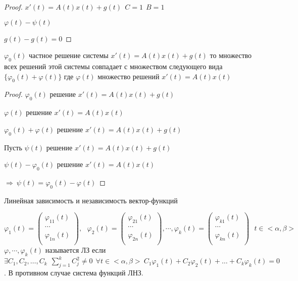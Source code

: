 \begin{proof}
  $x'(t) = A(t)x(t) + g(t) ~~ C = 1 ~~ B = 1$

  $\varphi(t) - \psi(t)$

  $g(t) - g(t) = 0$
\end{proof}

\begin{block}[Слeдствие 2]
  $\varphi_0(t)$ частное решение системы $x'(t) = A(t)x(t) + g(t)$ то
  множество всех решений этой системы совпадает с множеством следующего вида
  $\{\varphi_0(t) + \varphi(t)\}$ где $\varphi(t)$ множество решений
  $x'(t) = A(t)x(t)$
\end{block}

\begin{proof}
  $\varphi_0(t)$ решение $x'(t) = A(t)x(t) + g(t)$

  $\varphi(t)$ решение $x'(t) = A(t)x(t)$

  $\varphi_0(t) + \varphi(t)$ решение $x'(t) = A(t)x(t) + g(t)$

  Пусть $\psi(t)$ решение $x'(t) = A(t)x(t) + g(t)$

  $\psi(t) - \varphi_0(t)$ решение $x'(t) = A(t)x(t)$

  $\Rightarrow ~ \psi(t) = \varphi_0(t) - \varphi(t)$
\end{proof}

\begin{title}[\Large]
  Линейная зависимость и независимость вектор-функций
\end{title}

\begin{define}
  $$
  \varphi_1 (t) =
  \left(
  \begin{array}{c}
    \varphi_{11}(t) \\
    \cdots \\
    \varphi_{1n}(t) \\
  \end{array}
  \right),~~~
  \varphi_2 (t) =
  \left(
  \begin{array}{c}
    \varphi_{21}(t) \\
    \cdots \\
    \varphi_{2n}(t) \\
  \end{array}
  \right), \cdots,
  \varphi_k (t) =
  \left(
  \begin{array}{c}
    \varphi_{k1}(t) \\
    \cdots \\
    \varphi_{kn}(t) \\
  \end{array}
  \right) ~~~ t \in <\alpha, \beta>
  $$
  $\varphi, \cdots, \varphi_k(t)$ называется ЛЗ если $\exists C_1, C_2, \ldots,
  C_k ~~ \sum_{j=1}^k C_j^2 \not= 0 ~~ \forall t \in <\alpha, \beta> ~
  C_1\varphi_1(t) + C_2\varphi_2(t) + \ldots + C_k\varphi_k(t) = 0$. В
  противном случае система функций ЛНЗ.
\end{define}

